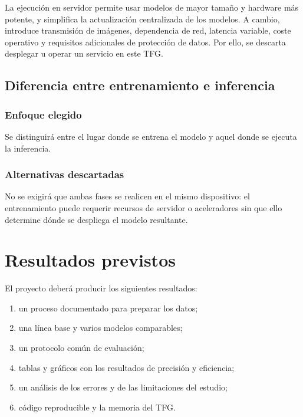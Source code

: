 La ejecución en servidor permite usar modelos de mayor tamaño y hardware más
potente, y simplifica la actualización centralizada de los modelos. A cambio,
introduce transmisión de imágenes, dependencia de red, latencia variable,
coste operativo y requisitos adicionales de protección de datos. Por ello, se
descarta desplegar u operar un servicio en este TFG.

\subsection{Diferencia entre entrenamiento e inferencia}

\subsubsection{Enfoque elegido}

Se distinguirá entre el lugar donde se entrena el modelo y aquel donde se
ejecuta la inferencia.

\subsubsection{Alternativas descartadas}

No se exigirá que ambas fases se realicen en el mismo dispositivo: el
entrenamiento puede requerir recursos de servidor o aceleradores sin que ello
determine dónde se despliega el modelo resultante.



\section{Resultados previstos}

El proyecto deberá producir los siguientes resultados:

\begin{enumerate}
  \item un proceso documentado para preparar los datos;
  \item una línea base y varios modelos comparables;
  \item un protocolo común de evaluación;
  \item tablas y gráficos con los resultados de precisión y eficiencia;
  \item un análisis de los errores y de las limitaciones del estudio;
  \item código reproducible y la memoria del TFG.
\end{enumerate}


